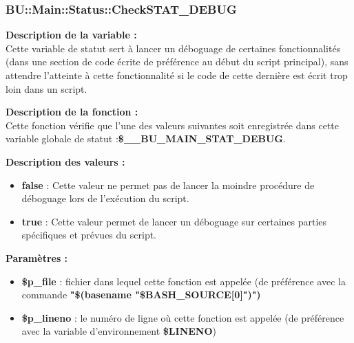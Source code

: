 \documentclass[a4paper,10pt]{article}
\begin{document}
\color{blue}
\subsubsection{\color{mauve}BU::Main::Status::CheckSTAT\_DEBUG}\color{white}

\begin{justify}
    \textbf{Description de la variable :}\\
    Cette variable de statut sert à lancer un déboguage de certaines fonctionnalités (dans une section de code écrite de préférence au début du script principal), sans attendre l'atteinte à cette fonctionnalité si le code de cette dernière est écrit trop loin dans un script.
\end{justify}

\begin{justify}
    \textbf{Description de la fonction :}\\
    Cette fonction vérifie que l'une des valeurs suivantes soit enregistrée dans cette variable globale de statut :\textbf{\color{orange}\$\_\_BU\_MAIN\_STAT\_DEBUG}.
\end{justify}

\begin{justify}
    \textbf{Description des valeurs :}

    \begin{itemize}
        \item \textbf{false} : Cette valeur ne permet pas de lancer la moindre procédure de déboguage lors de l'exécution du script.\\

        \item \textbf{true} : Cette valeur permet de lancer un déboguage sur certaines parties spécifiques et prévues du script.
    \end{itemize}

\end{justify}


\begin{justify}
    \textbf{Paramètres :}

    \begin{itemize}
        \item \color{orange}\textbf{\$p\_file}\color{white} : fichier dans lequel cette fonction est appelée (de préférence avec la commande \textbf{\textbf{"\$(\color{gray}basename \color{white}"\color{orange}\$BASH\_SOURCE[0]\color{white}")")}}\\

        \item \color{orange}\textbf{\$p\_lineno}\color{white} : le numéro de ligne où cette fonction est appelée (de préférence avec la variable d'environnement \textbf{\color{orange}\$LINENO})
    \end{itemize}
\end{justify}
\end{document}
